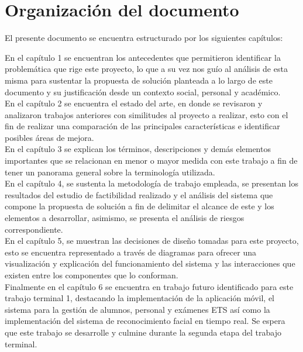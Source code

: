 
\section{Organización del documento}

El presente documento se encuentra estructurado por los siguientes capítulos:

En el capítulo 1 se encuentran los antecedentes que permitieron identificar la problemática que rige este proyecto, lo que a su vez nos guío al análisis de esta misma para sustentar la propuesta de solución planteada a lo largo de este documento y su justificación desde un contexto social, personal y académico.\\
 
En el capítulo 2 se encuentra el estado del arte, en donde se revisaron y analizaron trabajos anteriores con similitudes al proyecto a realizar, esto con el fin de realizar una comparación de las principales características e identificar posibles áreas de mejora.\\

En el capítulo 3 se explican los términos, descripciones y demás elementos importantes que se relacionan en menor o mayor medida con este trabajo a fin de tener un panorama general sobre la terminología utilizada.\\

En el capítulo 4, se sustenta la metodología de trabajo empleada, se presentan los resultados del estudio de factibilidad realizado y el análisis del sistema que compone la propuesta de solución a fin de delimitar el alcance de este y los elementos a desarrollar, asimismo, se presenta el análisis de riesgos correspondiente.\\

En el capítulo 5, se muestran las decisiones de diseño tomadas para este proyecto, esto se encuentra representado a través de diagramas para ofrecer una visualización y explicación del funcionamiento del sistema y las interacciones que existen entre los componentes que lo conforman.\\


Finalmente en el capítulo 6 se encuentra en trabajo futuro identificado para este trabajo terminal 1, destacando la implementación de la aplicación móvil, el sistema para la gestión de alumnos, personal y exámenes ETS así como la implementación del sistema de reconocimiento facial en tiempo real. Se espera que este trabajo se desarrolle y culmine durante la segunda etapa del trabajo terminal.